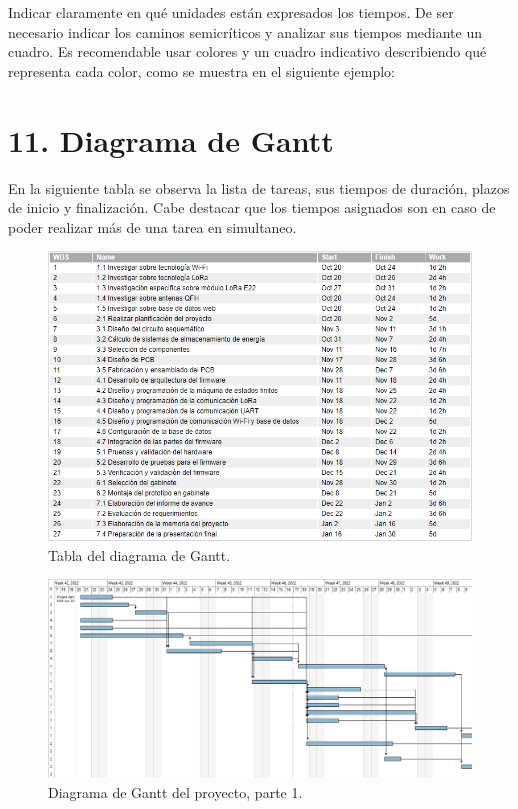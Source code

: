 \documentclass[
11pt, %
codirector, %
]{charter}
\begin{document}
Indicar claramente en qué unidades están expresados los tiempos.
De ser necesario indicar los caminos semicríticos y analizar sus tiempos mediante un cuadro.
Es recomendable usar colores y un cuadro indicativo describiendo qué representa cada color, como se muestra en el siguiente ejemplo:



\section{11. Diagrama de Gantt}
\label{sec:gantt}
En la siguiente tabla se observa la lista de tareas, sus tiempos de duración, plazos de inicio y finalización. Cabe destacar que los tiempos asignados son en caso de poder realizar más de una tarea en simultaneo.

\begin{figure}[htpb]
\centering 
\includegraphics[width=1\textwidth]{./Figuras/Tabla Gantt.png}
\caption{Tabla del diagrama de Gantt.}
\label{fig:tablaGantt}
\end{figure}

\begin{landscape}
\begin{figure}[htpb]
\centering 
\includegraphics[height=.7\textheight]{./Figuras/Diagrama Gantt 1.png}
\caption{Diagrama de Gantt del proyecto, parte 1.}
\label{fig:diagGantt1}
\end{figure}
\end{landscape}
\end{document}
